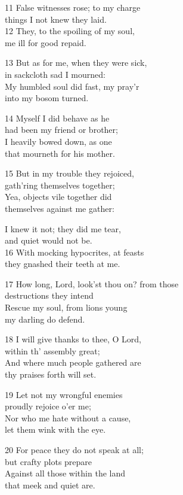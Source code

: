 11 False witnesses rose; to my charge\\
things I not knew they laid.\\
12 They, to the spoiling of my soul,\\
me ill for good repaid.

13 But as for me, when they were sick,\\
in sackcloth sad I mourned:\\
My humbled soul did fast, my pray’r\\
into my bosom turned.

14 Myself I did behave as he\\
had been my friend or brother;\\
I heavily bowed down, as one\\
that mourneth for his mother.

15 But in my trouble they rejoiced,\\
gath’ring themselves together;\\
Yea, objects vile together did\\
themselves against me gather:

I knew it not; they did me tear,\\
and quiet would not be.\\
16 With mocking hypocrites, at feasts\\
they gnashed their teeth at me.

17 How long, Lord, look’st thou on? from those\\
destructions they intend\\
Rescue my soul, from lions young\\
my darling do defend.

18 I will give thanks to thee, O Lord,\\
within th’ assembly great;\\
And where much people gathered are\\
thy praises forth will set.

19 Let not my wrongful enemies\\
proudly rejoice o’er me;\\
Nor who me hate without a cause,\\
let them wink with the eye.

20 For peace they do not speak at all;\\
but crafty plots prepare\\
Against all those within the land\\
that meek and quiet are.

